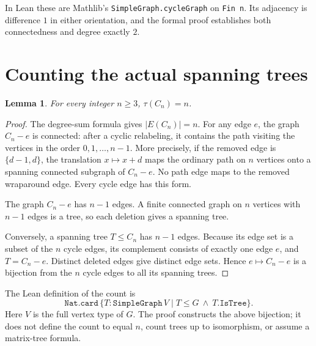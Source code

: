\documentclass[11pt]{article}
\newtheorem{lemma}{Lemma}
\begin{document}
In Lean these are Mathlib's \texttt{SimpleGraph.cycleGraph} on \texttt{Fin n}. Its adjacency is difference $1$ in either orientation, and the formal proof establishes both connectedness and degree exactly $2$.
\newpage

\section{Counting the actual spanning trees}
\begin{lemma}
For every integer $n\ge3$, $\tau(C_n)=n$.
\end{lemma}
\begin{proof}
The degree-sum formula gives $|E(C_n)|=n$. For any edge $e$, the graph $C_n-e$ is connected: after a cyclic relabeling, it contains the path visiting the vertices in the order $0,1,\ldots,n-1$. More precisely, if the removed edge is $\{d-1,d\}$, the translation $x\mapsto x+d$ maps the ordinary path on $n$ vertices onto a spanning connected subgraph of $C_n-e$. No path edge maps to the removed wraparound edge. Every cycle edge has this form.

The graph $C_n-e$ has $n-1$ edges. A finite connected graph on $n$ vertices with $n-1$ edges is a tree, so each deletion gives a spanning tree.

Conversely, a spanning tree $T\le C_n$ has $n-1$ edges. Because its edge set is a subset of the $n$ cycle edges, its complement consists of exactly one edge $e$, and $T=C_n-e$. Distinct deleted edges give distinct edge sets. Hence $e\mapsto C_n-e$ is a bijection from the $n$ cycle edges to all its spanning trees.
\end{proof}

The Lean definition of the count is
\[
 \texttt{Nat.card}\,\{T:\texttt{SimpleGraph}\,V
       \mid T\le G\ \land\ T.\texttt{IsTree}\}.
\]
Here $V$ is the full vertex type of $G$. The proof constructs the above bijection; it does not define the count to equal $n$, count trees up to isomorphism, or assume a matrix-tree formula.
\end{document}
